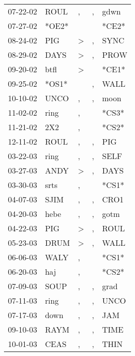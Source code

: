 \begin{supertabular}{lllll}
 07-22-02 &   ROUL &                , &                , &   gdwn \\
 07-27-02 &  *OE2* &                  &                  &  *CE2* \\
 08-24-02 &    PIG &     \textgreater &                , &   SYNC \\
 08-29-02 &   DAYS &     \textgreater &                , &   PROW \\
 09-20-02 &   btfl &     \textgreater &                  &  *CE1* \\
 09-25-02 &  *OS1* &                  &                , &   WALL \\
 10-10-02 &   UNCO &                , &                , &   moon \\
 11-02-02 &   ring &                , &                  &  *CS3* \\
 11-21-02 &    2X2 &                , &                  &  *CS2* \\
 12-11-02 &   ROUL &                , &                , &    PIG \\
 03-22-03 &   ring &                , &                , &   SELF \\
 03-27-03 &   ANDY &     \textgreater &                , &   DAYS \\
 03-30-03 &   srts &                , &                  &  *CS1* \\
 04-07-03 &   SJIM &                , &                , &   CRO1 \\
 04-20-03 &   hebe &                , &                , &   gotm \\
 04-22-03 &    PIG &     \textgreater &                , &   ROUL \\
 05-23-03 &   DRUM &     \textgreater &                , &   WALL \\
 06-06-03 &   WALY &                , &                  &  *CS1* \\
 06-20-03 &    haj &                , &                  &  *CS2* \\
 07-09-03 &   SOUP &                , &                , &   grad \\
 07-11-03 &   ring &                , &                , &   UNCO \\
 07-17-03 &   down &                , &                , &    JAM \\
 09-10-03 &   RAYM &                , &                , &   TIME \\
 10-01-03 &   CEAS &                , &                , &   THIN \\

\end{supertabular}
